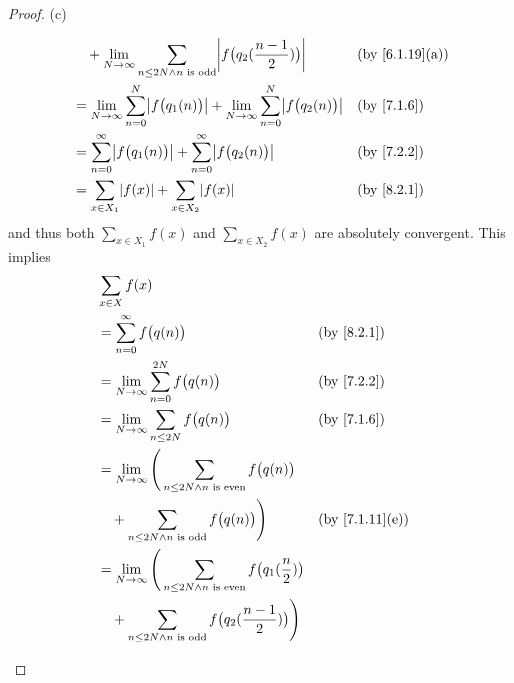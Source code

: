 \begin{proof}{(c)}
\begin{itemize}
\begin{align*}
             & \quad + \lim_{N \to \infty} \sum_{n \leq 2N \land n \text{ is odd}} \abs{f\big(q_2(\dfrac{n - 1}{2})\big)}                &  & \text{(by \cref{6.1.19}(a))} \\
             & = \lim_{N \to \infty} \sum_{n = 0}^N \abs{f\big(q_1(n)\big)} + \lim_{N \to \infty} \sum_{n = 0}^N \abs{f\big(q_2(n)\big)} &  & \by{7.1.6}                   \\
             & = \sum_{n = 0}^\infty \abs{f\big(q_1(n)\big)} + \sum_{n = 0}^\infty \abs{f\big(q_2(n)\big)}                               &  & \by{7.2.2}                   \\
             & = \sum_{x \in X_1} \abs{f(x)} + \sum_{x \in X_2} \abs{f(x)}                                                               &  & \by{8.2.1}
          \end{align*}
          and thus both \(\sum_{x \in X_1} f(x)\) and \(\sum_{x \in X_2} f(x)\) are absolutely convergent.
          This implies
          \begin{align*}
             & \sum_{x \in X} f(x)                                                                                                                             \\
             & = \sum_{n = 0}^\infty f\big(q(n)\big)                                                                         &  & \by{8.2.1}                   \\
             & = \lim_{N \to \infty} \sum_{n = 0}^{2N} f\big(q(n)\big)                                                       &  & \by{7.2.2}                   \\
             & = \lim_{N \to \infty} \sum_{n \leq 2N} f\big(q(n)\big)                                                        &  & \by{7.1.6}                   \\
             & = \lim_{N \to \infty} \Bigg(\sum_{n \leq 2N \land n \text{ is even}} f\big(q(n)\big)                                                            \\
             & \quad + \sum_{n \leq 2N \land n \text{ is odd}} f\big(q(n)\big)\Bigg)                                         &  & \text{(by \cref{7.1.11}(e))} \\
             & = \lim_{N \to \infty} \Bigg(\sum_{n \leq 2N \land n \text{ is even}} f\big(q_1(\dfrac{n}{2})\big)                                               \\
             & \quad + \sum_{n \leq 2N \land n \text{ is odd}} f\big(q_2(\dfrac{n - 1}{2})\big)\Bigg)                                                          \\

\end{align*}
\end{itemize}
\end{proof}
